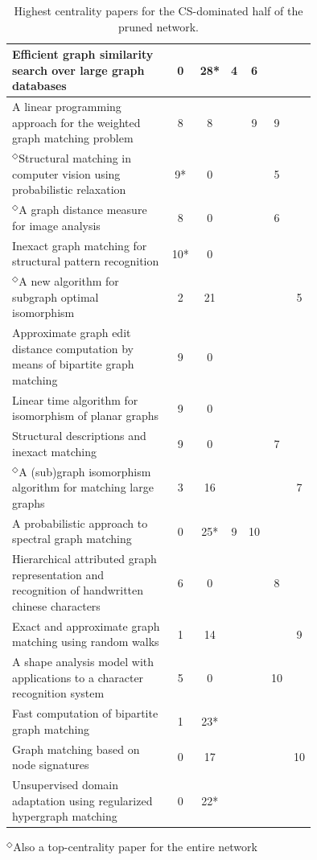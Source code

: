 \documentclass[12pt]{thesis}
\theoremstyle{plain}
\theoremstyle{definition}
\theoremstyle{remark}
\begin{document}
\begin{table}[H]
{\begin{tabular}{|L{0.75\linewidth}|c|c|c|c|c|c|}
Efficient graph similarity search over large graph databases  \cite{Zheng_2015} & 0 & 28* & 4 & 6 &  &  \\ \hline
A linear programming approach for the weighted graph matching problem  \cite{Almohamad_1993} & 8 & 8 &  & 9 & 9 &  \\ \hline
$^\Diamond$Structural matching in computer vision using probabilistic relaxation  \cite{Christmas_1995} & 9* & 0 &  &  & 5 &  \\ \hline
$^\Diamond$A graph distance measure for image analysis  \cite{Eshera_1984} & 8 & 0 &  &  & 6 &  \\ \hline
Inexact graph matching for structural pattern recognition  \cite{Bunke_1983} & 10* & 0 &  &  &  &  \\ \hline
$^\Diamond$A new algorithm for subgraph optimal isomorphism  \cite{El_Sonbaty_1998} & 2 & 21 &  &  &  & 5 \\ \hline
Approximate graph edit distance computation by means of bipartite graph matching  \cite{Riesen_2009} & 9 & 0 &  &  &  &  \\ \hline
Linear time algorithm for isomorphism of planar graphs  \cite{Hopcroft_1974} & 9 & 0 &  &  &  &  \\ \hline
Structural descriptions and inexact matching  \cite{Shapiro_1981} & 9 & 0 &  &  & 7 &  \\ \hline
$^\Diamond$A (sub)graph isomorphism algorithm for matching large graphs  \cite{Cordella_2004} & 3 & 16 &  &  &  & 7 \\ \hline
A probabilistic approach to spectral graph matching  \cite{Egozi_2013} & 0 & 25* & 9 & 10 &  &  \\ \hline
Hierarchical attributed graph representation and recognition of handwritten chinese characters  \cite{Lu_1991} & 6 & 0 &  &  & 8 &  \\ \hline
Exact and approximate graph matching using random walks  \cite{Gori_2005} & 1 & 14 &  &  &  & 9 \\ \hline
A shape analysis model with applications to a character recognition system  \cite{Rocha_1994} & 5 & 0 &  &  & 10 &  \\ \hline
Fast computation of bipartite graph matching  \cite{Serratosa_2014} & 1 & 23* &  &  &  &  \\ \hline
Graph matching based on node signatures  \cite{Jouili_2009} & 0 & 17 &  &  &  & 10 \\ \hline
Unsupervised domain adaptation using regularized hypergraph matching  \cite{Das_2018} & 0 & 22* &  &  &  &  \\ \hline
\end{tabular}

\vspace{-.01cm}
$^\Diamond$Also a top-centrality paper for the entire network}
\vspace{-.22cm}
\centering
\caption{Highest centrality papers for the CS-dominated half of the pruned network.}
\label{tab:toppapers_CS}
\end{table}
\end{document}
